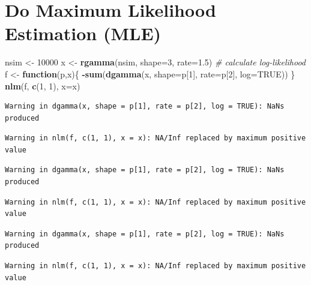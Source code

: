\documentclass[
]{book}
\newenvironment{Shaded}{\begin{snugshade}}{\end{snugshade}}
\newcommand{\CommentTok}[1]{\textcolor[rgb]{0.56,0.35,0.01}{\textit{#1}}}
\newcommand{\ControlFlowTok}[1]{\textcolor[rgb]{0.13,0.29,0.53}{\textbf{#1}}}
\newcommand{\DataTypeTok}[1]{\textcolor[rgb]{0.13,0.29,0.53}{#1}}
\newcommand{\DecValTok}[1]{\textcolor[rgb]{0.00,0.00,0.81}{#1}}
\newcommand{\FloatTok}[1]{\textcolor[rgb]{0.00,0.00,0.81}{#1}}
\newcommand{\KeywordTok}[1]{\textcolor[rgb]{0.13,0.29,0.53}{\textbf{#1}}}
\newcommand{\NormalTok}[1]{#1}
\newcommand{\OperatorTok}[1]{\textcolor[rgb]{0.81,0.36,0.00}{\textbf{#1}}}
\newcommand{\OtherTok}[1]{\textcolor[rgb]{0.56,0.35,0.01}{#1}}
\newcommand{\StringTok}[1]{\textcolor[rgb]{0.31,0.60,0.02}{#1}}
\begin{document}
\hypertarget{do-maximum-likelihood-estimation-mle}{%
\section{Do Maximum Likelihood Estimation (MLE)}\label{do-maximum-likelihood-estimation-mle}}

\begin{Shaded}
\begin{Highlighting}[]
\NormalTok{nsim <-}\StringTok{ }\DecValTok{10000}
\NormalTok{x <-}\StringTok{ }\KeywordTok{rgamma}\NormalTok{(nsim, }\DataTypeTok{shape=}\DecValTok{3}\NormalTok{, }\DataTypeTok{rate=}\FloatTok{1.5}\NormalTok{)}
\CommentTok{# calculate log-likelihood}
\NormalTok{f <-}\StringTok{ }\ControlFlowTok{function}\NormalTok{(p,x)\{}
	\OperatorTok{-}\KeywordTok{sum}\NormalTok{(}\KeywordTok{dgamma}\NormalTok{(x, }\DataTypeTok{shape=}\NormalTok{p[}\DecValTok{1}\NormalTok{], }\DataTypeTok{rate=}\NormalTok{p[}\DecValTok{2}\NormalTok{], }\DataTypeTok{log=}\OtherTok{TRUE}\NormalTok{))}
\NormalTok{\}}
\KeywordTok{nlm}\NormalTok{(f, }\KeywordTok{c}\NormalTok{(}\DecValTok{1}\NormalTok{, }\DecValTok{1}\NormalTok{), }\DataTypeTok{x=}\NormalTok{x)}
\end{Highlighting}
\end{Shaded}

\begin{verbatim}
Warning in dgamma(x, shape = p[1], rate = p[2], log = TRUE): NaNs produced
\end{verbatim}

\begin{verbatim}
Warning in nlm(f, c(1, 1), x = x): NA/Inf replaced by maximum positive value
\end{verbatim}

\begin{verbatim}
Warning in dgamma(x, shape = p[1], rate = p[2], log = TRUE): NaNs produced
\end{verbatim}

\begin{verbatim}
Warning in nlm(f, c(1, 1), x = x): NA/Inf replaced by maximum positive value
\end{verbatim}

\begin{verbatim}
Warning in dgamma(x, shape = p[1], rate = p[2], log = TRUE): NaNs produced
\end{verbatim}

\begin{verbatim}
Warning in nlm(f, c(1, 1), x = x): NA/Inf replaced by maximum positive value
\end{verbatim}
\end{document}
